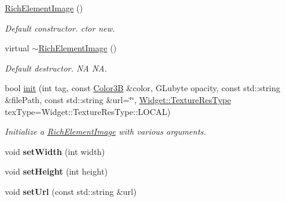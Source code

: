 \begin{DoxyCompactItemize}
\item 
\mbox{\label{classui_1_1RichElementImage_a72aa8d3dcb46e4e93c9d2526482fce06}} 
\hyperlink{classui_1_1RichElementImage_a72aa8d3dcb46e4e93c9d2526482fce06}{Rich\+Element\+Image} ()
\begin{DoxyCompactList}\small\item\em Default constructor.  ctor  new. \end{DoxyCompactList}\item 
\mbox{\label{classui_1_1RichElementImage_a07999205fee48600bd1ca5fe28648721}} 
virtual \hyperlink{classui_1_1RichElementImage_a07999205fee48600bd1ca5fe28648721}{$\sim$\+Rich\+Element\+Image} ()
\begin{DoxyCompactList}\small\item\em Default destructor.  NA  NA. \end{DoxyCompactList}\item 
bool \hyperlink{classui_1_1RichElementImage_a5108e4bf5b53bb350f03c6b457da5abe}{init} (int tag, const \hyperlink{structColor3B}{Color3B} \&color, G\+Lubyte opacity, const std\+::string \&file\+Path, const std\+::string \&url=\char`\"{}\char`\"{}, \hyperlink{classui_1_1Widget_a040a65ec5ad3b11119b7e16b98bd9af0}{Widget\+::\+Texture\+Res\+Type} tex\+Type=Widget\+::\+Texture\+Res\+Type\+::\+L\+O\+C\+AL)
\begin{DoxyCompactList}\small\item\em Initialize a \hyperlink{classui_1_1RichElementImage}{Rich\+Element\+Image} with various arguments. \end{DoxyCompactList}\item 
\mbox{\label{classui_1_1RichElementImage_a7e888b80ca618bb21d838c493e46cbd9}} 
void {\bfseries set\+Width} (int width)
\item 
\mbox{\label{classui_1_1RichElementImage_ab25abf34aeb380fba5250a6799284fba}} 
void {\bfseries set\+Height} (int height)
\item 
\mbox{\label{classui_1_1RichElementImage_a5376cfdd4f9ec0cdfed63c4e661e4b0c}} 
void {\bfseries set\+Url} (const std\+::string \&url)
\end{DoxyCompactItemize}
